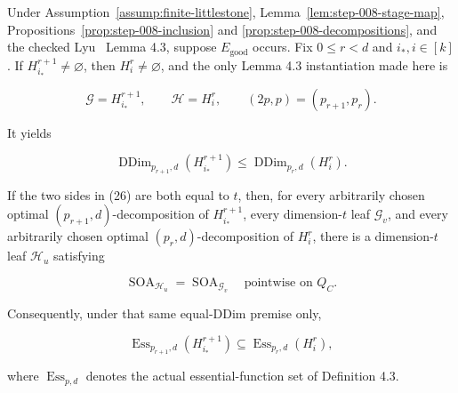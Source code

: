 \begin{proposition}\label{prop:step-008-transition}
Under Assumption~\ref{assump:finite-littlestone},
Lemma~\ref{lem:step-008-stage-map},
Propositions~\ref{prop:step-008-inclusion} and
\ref{prop:step-008-decompositions}, and the checked Lyu~\citep{lyu2025} Lemma 4.3, suppose
\(E_{\mathrm{good}}\) occurs. Fix \(0\le r<d\) and \(i_*,i\in[k]\).
If \(H_{i_*}^{r+1}\ne\varnothing\), then \(H_i^r\ne\varnothing\), and the
only Lemma 4.3 instantiation made here is

\[
 \mathcal G=H_{i_*}^{r+1},\qquad
 \mathcal H=H_i^r,\qquad
 (2p,p)=(p_{r+1},p_r).
\tag{25}
\]

It yields

\[
 \operatorname{DDim}_{p_{r+1},d}(H_{i_*}^{r+1})
 \le
 \operatorname{DDim}_{p_r,d}(H_i^r).
\tag{26}
\]

If the two sides in (26) are both equal to \(t\), then, for every
arbitrarily chosen optimal \((p_{r+1},d)\)-decomposition of
\(H_{i_*}^{r+1}\), every dimension-\(t\) leaf \(\mathcal G_v\), and every
arbitrarily chosen optimal \((p_r,d)\)-decomposition of \(H_i^r\), there
is a dimension-\(t\) leaf \(\mathcal H_u\) satisfying

\[
 \operatorname{SOA}_{\mathcal H_u}
 =\operatorname{SOA}_{\mathcal G_v}
 \quad\text{pointwise on }Q_C.
\tag{27}
\]

Consequently, under that same equal-DDim premise only,

\[
 \operatorname{Ess}_{p_{r+1},d}(H_{i_*}^{r+1})
 \subseteq
 \operatorname{Ess}_{p_r,d}(H_i^r),
\tag{28}
\]

where \(\operatorname{Ess}_{p,d}\) denotes the actual essential-function
set of Definition 4.3.


\end{proposition}

